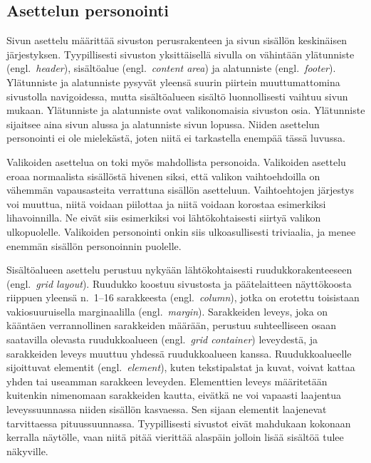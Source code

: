 \documentclass[finnish, 12pt, a4paper, elec, utf8, a-1b, online]{aaltothesis}
\begin{document}
\subsection{Asettelun personointi}\label{layout-personalization}

Sivun asettelu määrittää sivuston perusrakenteen ja sivun sisällön keskinäisen
järjestyksen. Tyypillisesti sivuston yksittäisellä sivulla on vähintään
ylätunniste (engl.~\textit{header}), sisältöalue (engl.~\textit{content area})
ja alatunniste (engl.~\textit{footer}). Ylätunniste ja alatunniste pysyvät
yleensä suurin piirtein muuttumattomina sivustolla navigoidessa, mutta
sisältöalueen sisältö luonnollisesti vaihtuu sivun mukaan. Ylätunniste ja
alatunniste ovat valikonomaisia sivuston osia. Ylätunniste sijaitsee aina sivun
alussa ja alatunniste sivun lopussa. Niiden asettelun personointi ei ole
mielekästä, joten niitä ei tarkastella enempää tässä luvussa.

Valikoiden asettelua on toki myös mahdollista personoida. Valikoiden asettelu
eroaa normaalista sisällöstä hivenen siksi, että valikon vaihtoehdoilla on
vähemmän vapausasteita verrattuna sisällön asetteluun. Vaihtoehtojen järjestys
voi muuttua, niitä voidaan piilottaa ja niitä voidaan korostaa esimerkiksi
lihavoinnilla. Ne eivät siis esimerkiksi voi lähtökohtaisesti siirtyä valikon
ulkopuolelle. Valikoiden personointi onkin siis ulkoasullisesti triviaalia, ja
menee enemmän sisällön personoinnin puolelle.

Sisältöalueen asettelu perustuu nykyään lähtökohtaisesti ruudukkorakenteeseen
(engl.~\textit{grid layout}). Ruudukko koostuu sivustosta ja päätelaitteen
näyttökoosta riippuen yleensä n.~1--16 sarakkeesta (engl.~\textit{column}),
jotka on erotettu toisistaan vakiosuuruisella marginaalilla
(engl.~\textit{margin}). Sarakkeiden leveys, joka on kääntäen verrannollinen
sarakkeiden määrään, perustuu suhteelliseen osaan saatavilla olevasta
ruudukkoalueen (engl.~\textit{grid container}) leveydestä, ja sarakkeiden leveys
muuttuu yhdessä ruudukkoalueen kanssa. Ruudukkoalueelle sijoittuvat elementit
(engl.~\textit{element}), kuten tekstipalstat ja kuvat, voivat kattaa yhden tai
useamman sarakkeen leveyden. Elementtien leveys määritetään kuitenkin nimenomaan
sarakkeiden kautta, eivätkä ne voi vapaasti laajentua leveyssuunnassa niiden
sisällön kasvaessa. Sen sijaan elementit laajenevat tarvittaessa
pituussuunnassa. Tyypillisesti sivustot eivät mahdukaan kokonaan kerralla
näytölle, vaan niitä pitää vierittää alaspäin jolloin lisää sisältöä tulee
näkyville.
\end{document}
